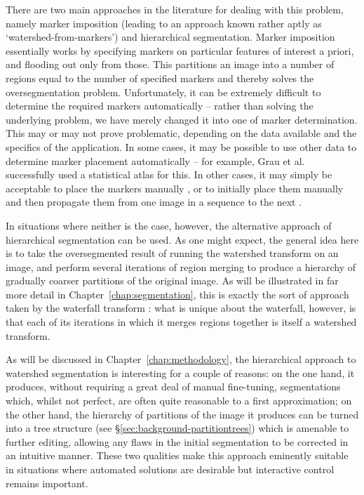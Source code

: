 There are two main approaches in the literature for dealing with this problem, namely marker imposition (leading to an approach known rather aptly as `watershed-from-markers') and hierarchical segmentation. Marker imposition essentially works by specifying markers on particular features of interest a priori, and flooding out only from those. This partitions an image into a number of regions equal to the number of specified markers and thereby solves the oversegmentation problem. Unfortunately, it can be extremely difficult to determine the required markers automatically -- rather than solving the underlying problem, we have merely changed it into one of marker determination. This may or may not prove problematic, depending on the data available and the specifics of the application. In some cases, it may be possible to use other data to determine marker placement automatically -- for example, Grau et al.\ \cite{grau04} successfully used a statistical atlas for this. In other cases, it may simply be acceptable to place the markers manually \cite{xue05}, or to initially place them manually and then propagate them from one image in a sequence to the next \cite{flores09}.

In situations where neither is the case, however, the alternative approach of hierarchical segmentation can be used. As one might expect, the general idea here is to take the oversegmented result of running the watershed transform on an image, and perform several iterations of region merging to produce a hierarchy of gradually coarser partitions of the original image. As will be illustrated in far more detail in Chapter~\ref{chap:segmentation}, this is exactly the sort of approach taken by the waterfall transform \cite{beucher90,marcotegui05}: what is unique about the waterfall, however, is that each of its iterations in which it merges regions together is itself a watershed transform.

As will be discussed in Chapter~\ref{chap:methodology}, the hierarchical approach to watershed segmentation is interesting for a couple of reasons: on the one hand, it produces, without requiring a great deal of manual fine-tuning, segmentations which, whilst not perfect, are often quite reasonable to a first approximation; on the other hand, the hierarchy of partitions of the image it produces can be turned into a tree structure (see \S\ref{sec:background-partitiontrees}) which is amenable to further editing, allowing any flaws in the initial segmentation to be corrected in an intuitive manner. These two qualities make this approach eminently suitable in situations where automated solutions are desirable but interactive control remains important.

